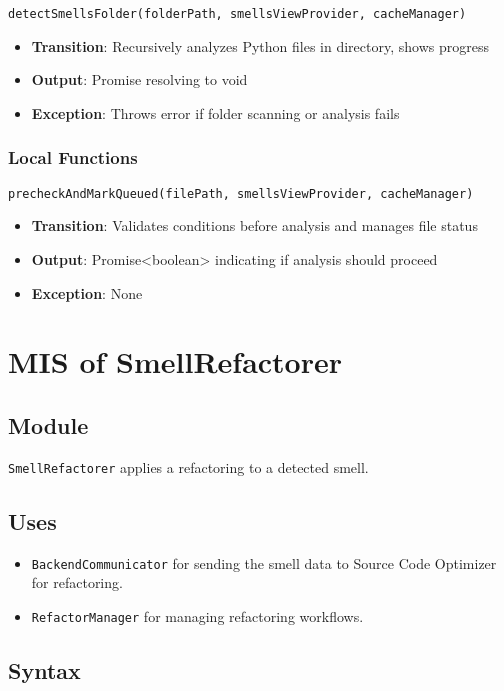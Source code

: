 \documentclass[12pt, titlepage]{article}
\begin{document}
\texttt{detectSmellsFolder(folderPath, smellsViewProvider, cacheManager)}
\begin{itemize}
\item \textbf{Transition}: Recursively analyzes Python files in directory, shows progress
\item \textbf{Output}: Promise resolving to void
\item \textbf{Exception}: Throws error if folder scanning or analysis fails
\end{itemize}

\subsubsection{Local Functions}
\texttt{precheckAndMarkQueued(filePath, smellsViewProvider, cacheManager)}
\begin{itemize}
\item \textbf{Transition}: Validates conditions before analysis and manages file status
\item \textbf{Output}: Promise<boolean> indicating if analysis should proceed
\item \textbf{Exception}: None
\end{itemize}

\section{MIS of SmellRefactorer}

\subsection{Module}
\texttt{SmellRefactorer} applies a refactoring to a detected smell.

\subsection{Uses}
\begin{itemize}
\item \texttt{BackendCommunicator} for sending the smell data to Source Code Optimizer for refactoring.
\item \texttt{RefactorManager} for managing refactoring workflows.
\end{itemize}

\subsection{Syntax}
\end{document}
